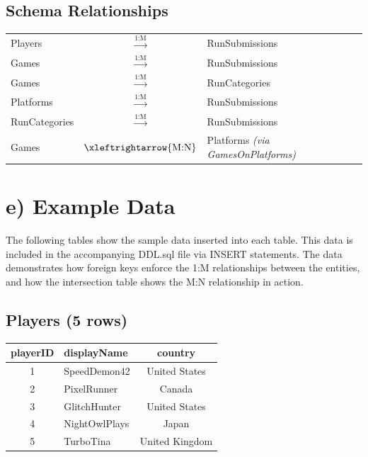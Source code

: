\documentclass[11pt]{article}
\begin{document}
\subsection*{Schema Relationships}

\begin{center}
\begin{tabular}{lcl}
Players & $\xrightarrow{\text{1:M}}$ & RunSubmissions \\
Games & $\xrightarrow{\text{1:M}}$ & RunSubmissions \\
Games & $\xrightarrow{\text{1:M}}$ & RunCategories \\
Platforms & $\xrightarrow{\text{1:M}}$ & RunSubmissions \\
RunCategories & $\xrightarrow{\text{1:M}}$ & RunSubmissions \\
Games & $\xleftrightarrow{\text{M:N}}$ & Platforms \textit{(via GamesOnPlatforms)} \\
\end{tabular}
\end{center}

\hrulefill

\section*{e) Example Data}

The following tables show the sample data inserted into each table. This data is included in the accompanying DDL.sql file via INSERT statements. The data demonstrates how foreign keys enforce the 1:M relationships between the entities, and how the intersection table shows the M:N relationship in action.

\subsection*{Players (5 rows)}

\begin{center}
\begin{tabular}{clc}
\toprule
\textbf{playerID} & \textbf{displayName} & \textbf{country} \\
\midrule
1 & SpeedDemon42 & United States \\
2 & PixelRunner & Canada \\
3 & GlitchHunter & United States \\
4 & NightOwlPlays & Japan \\
5 & TurboTina & United Kingdom \\
\bottomrule
\end{tabular}
\end{center}
\end{document}
